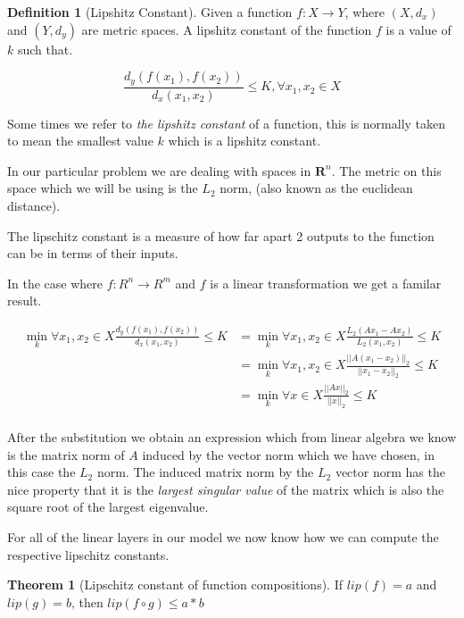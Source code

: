 \documentclass[12pt, a4paper]{report}
\theoremstyle{definition}
\newtheorem{definition}{Definition}[section]
\newtheorem{theorem}{Theorem}
\begin{document}
\begin{definition}[Lipshitz Constant]
    Given a function $f: X \rightarrow Y$, where $(X, d_x)$ and $(Y, d_y)$ are metric spaces. A lipshitz constant of the function $f$ is a value of $k$ such that.

    $$\frac{d_y(f(x_1), f(x_2))}{d_x(x_1, x_2)} \leq K, \forall x_1, x_2 \in X $$
\end{definition}

Some times we refer to \textit{the lipshitz constant} of a function, this is normally taken to mean the smallest value $k$ which is a lipshitz constant.

In our particular problem we are dealing with spaces in $\mathbf{R}^n$. The metric on this space which we will be using is the $L_2$ norm, (also known as the euclidean distance).

The lipschitz constant is a measure of how far apart 2 outputs to the function can be in terms of their inputs.

In the case where $f: R^n \rightarrow R^m$ and $f$ is a linear transformation we get a familar result.

\begin{align*}
    \min_k  \forall x_1,x_2 \in X \frac{d_y(f(x_1), f(x_2))}{d_x(x_1, x_2)} \leq K &= \min_k \forall x_1,x_2 \in X \frac{ L_2(Ax_1 - Ax_2)  }{ L_2(x_1, x_2)} \leq K \\
    &=  \min_k \forall x_1,x_2 \in X  \frac{ ||A(x_1 - x_2)||_2  }{ ||x_1- x_2||_2 } \leq K \\
    &=  \min_k \forall x \in X  \frac{ ||Ax||_2  }{ ||x||_2 } \leq K \\
\end{align*}

After the substitution we obtain an expression which from linear algebra we know is the matrix norm of $A$ induced by the vector norm which we have chosen, in this case the $L_2$ norm. The induced matrix norm by the $L_2$ vector norm has the nice property that it is the \textit{largest singular value} of the matrix which is also the square root of the largest eigenvalue.

For all of the linear layers in our model we now know how we can compute the respective lipschitz constants.

\begin{theorem}[Lipschitz constant of function compositions]
    If $lip(f) = a$ and $lip(g) = b$, then $lip(f \circ g) \leq a * b$
\end{theorem}
\end{document}
